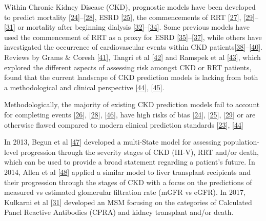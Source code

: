 \documentclass[12pt,PhD,twoside,openright]{muthesis}
\begin{document}
Within Chronic Kidney Disease (CKD), prognostic models have been developed to predict mortality {[}\protect\hyperlink{ref-johnson_predicting_2007}{24}{]}--{[}\protect\hyperlink{ref-wick_clinical_2017}{28}{]}, ESRD {[}\protect\hyperlink{ref-landray_prediction_2010}{25}{]}, the commencements of RRT {[}\protect\hyperlink{ref-marks_looking_2015}{27}{]}, {[}\protect\hyperlink{ref-johnson_predicting_2008}{29}{]}--{[}\protect\hyperlink{ref-kulkarni_transition_2017}{31}{]} or mortality after beginning dialysis {[}\protect\hyperlink{ref-floege_development_2015}{32}{]}--{[}\protect\hyperlink{ref-cao_predicting_2015}{34}{]}. Some previous models have used the commencement of RRT as a proxy for ESRD {[}\protect\hyperlink{ref-tangri_predictive_2011}{35}{]}--{[}\protect\hyperlink{ref-tangri_dynamic_2017}{37}{]}, while others have investigated the occurrence of cardiovascular events within CKD patients{[}\protect\hyperlink{ref-shlipak_cardiovascular_2005}{38}{]}--{[}\protect\hyperlink{ref-mcmurray_predictors_2011}{40}{]}. Reviews by Grams \& Coresh {[}\protect\hyperlink{ref-grams_assessing_2013}{41}{]}, Tangri et al {[}\protect\hyperlink{ref-tangri_risk_2013}{42}{]} and Ramspek et al {[}\protect\hyperlink{ref-ramspek_prediction_2017}{43}{]}, which explored the different aspects of assessing risk amongst CKD or RRT patients, found that the current landscape of CKD prediction models is lacking from both a methodological and clinical perspective {[}\protect\hyperlink{ref-collins_transparent_2015}{44}{]}, {[}\protect\hyperlink{ref-bouwmeester_reporting_2012-1}{45}{]}.

Methodologically, the majority of existing CKD prediction models fail to account for completing events {[}\protect\hyperlink{ref-bansal_development_2015}{26}{]}, {[}\protect\hyperlink{ref-wick_clinical_2017}{28}{]}, {[}\protect\hyperlink{ref-perotte_risk_2015}{46}{]}, have high risks of bias {[}\protect\hyperlink{ref-johnson_predicting_2007}{24}{]}, {[}\protect\hyperlink{ref-landray_prediction_2010}{25}{]}, {[}\protect\hyperlink{ref-johnson_predicting_2008}{29}{]} or are otherwise flawed compared to modern clinical prediction standards {[}\protect\hyperlink{ref-steyerberg_prognosis_2013}{23}{]}, {[}\protect\hyperlink{ref-collins_transparent_2015}{44}{]}

In 2013, Begun et al {[}\protect\hyperlink{ref-begun_identification_2013}{47}{]} developed a multi-State model for assessing population-level progression through the severity stages of CKD (III-V), RRT and/or death, which can be used to provide a broad statement regarding a patient's future. In 2014, Allen et al {[}\protect\hyperlink{ref-allen_chronic_2014}{48}{]} applied a similar model to liver transplant recipients and their progression through the stages of CKD with a focus on the predictions of measured vs estimated glomerular filtration rate (mGFR vs eGFR). In 2017, Kulkarni et al {[}\protect\hyperlink{ref-kulkarni_transition_2017}{31}{]} developed an MSM focusing on the categories of Calculated Panel Reactive Antibodies (CPRA) and kidney transplant and/or death.
\end{document}
